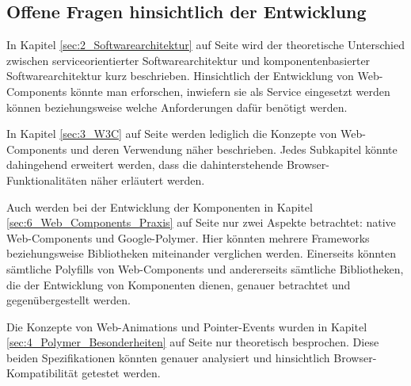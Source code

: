\subsection{Offene Fragen hinsichtlich der Entwicklung}
\label{sec:7_Fragen}

In Kapitel \ref{sec:2_Softwarearchitektur} auf Seite \pageref{sec:2_Softwarearchitektur} wird der theoretische Unterschied zwischen serviceorientierter Softwarearchitektur und komponentenbasierter Softwarearchitektur kurz beschrieben. Hinsichtlich der Entwicklung von Web-Components könnte man erforschen, inwiefern sie als Service eingesetzt werden können beziehungsweise welche Anforderungen dafür benötigt werden.

In Kapitel \ref{sec:3_W3C} auf Seite \pageref{sec:3_W3C} werden lediglich die Konzepte von Web-Components und deren Verwendung näher beschrieben. Jedes Subkapitel könnte dahingehend erweitert werden, dass die dahinterstehende Browser-Funktionalitäten näher erläutert werden.

Auch werden bei der Entwicklung der Komponenten in Kapitel \ref{sec:6_Web_Components_Praxis} auf Seite \pageref{sec:6_Web_Components_Praxis} nur zwei Aspekte betrachtet: native Web-Components und Google-Polymer. Hier könnten mehrere Frameworks beziehungsweise Bibliotheken miteinander verglichen werden. Einerseits könnten sämtliche Polyfills von Web-Components und andererseits sämtliche Bibliotheken, die der Entwicklung von Komponenten dienen, genauer betrachtet und gegenübergestellt werden.

Die Konzepte von Web-Animations und Pointer-Events wurden in Kapitel \ref{sec:4_Polymer_Besonderheiten} auf Seite \pageref{sec:4_Polymer_Besonderheiten} nur theoretisch besprochen. Diese beiden Spezifikationen könnten genauer analysiert und hinsichtlich Browser-Kompatibilität getestet werden.